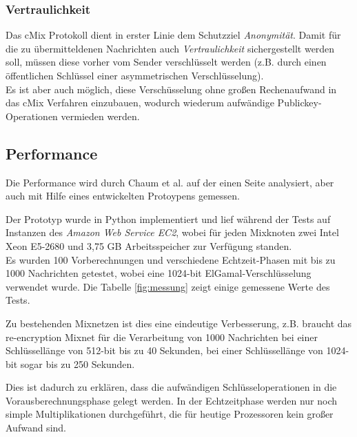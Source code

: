 \documentclass[
    fontsize=12pt,
    headings=small,
    parskip=half,           %
    bibliography=totoc,
    numbers=noenddot,       %
    open=any,               %
    final                   %
    ]{scrreprt}
\begin{document}
\subsubsection{Vertraulichkeit}

Das cMix Protokoll dient in erster Linie dem Schutzziel \textit{Anonymität}.
Damit für die zu übermitteldenen Nachrichten auch \textit{Vertraulichkeit} sichergestellt werden soll, müssen diese vorher vom Sender verschlüsselt werden (z.B. durch einen öffentlichen Schlüssel einer asymmetrischen Verschlüsselung).\\
Es ist aber auch möglich, diese Verschüsselung ohne großen Rechenaufwand in das cMix Verfahren einzubauen, wodurch wiederum aufwändige Publickey-Operationen vermieden werden.

\subsection{Performance}

Die Performance wird durch Chaum et al. auf der einen Seite analysiert, aber auch mit Hilfe eines entwickelten Protoypens gemessen.

Der Prototyp wurde in Python implementiert und lief während der Tests auf Instanzen des \textit{Amazon Web Service EC2}, wobei für jeden Mixknoten zwei Intel Xeon E5-2680 und 3,75 GB Arbeitsspeicher zur Verfügung standen.\\
Es wurden 100 Vorberechnungen und verschiedene Echtzeit-Phasen mit bis zu 1000 Nachrichten getestet, wobei eine 1024-bit ElGamal-Verschlüsselung verwendet wurde.
Die Tabelle \ref{fig:messung} zeigt einige gemessene Werte des Tests.

Zu bestehenden Mixnetzen ist dies eine eindeutige Verbesserung,
z.B. braucht das re-encryption Mixnet für die Verarbeitung von 1000 Nachrichten bei einer Schlüssellänge von 512-bit bis zu 40 Sekunden, bei einer Schlüssellänge von 1024-bit sogar bis zu 250 Sekunden. \cite{ribarski2012mixnets}

Dies ist dadurch zu erklären, dass die aufwändigen Schlüsseloperationen in die Vorausberechnungsphase gelegt werden. In der Echtzeitphase werden nur noch simple Multiplikationen durchgeführt, die für heutige Prozessoren kein großer Aufwand sind.

~\\


\begin{figure}[h]
\end{figure}
\end{document}
